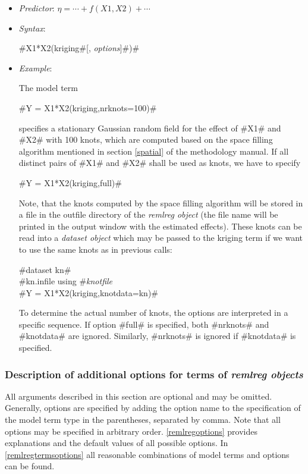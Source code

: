 \begin{itemize}
\item[] {\em Predictor}: $\eta= \cdots + f(X1,X2) + \cdots$
\item[] {\em Syntax}:

#X1*X2(kriging#[, {\em options}]#)# \item[] {\em Example}:

The model term

#Y = X1*X2(kriging,nrknots=100)#

specifies a stationary Gaussian random field for the effect of
#X1# and #X2# with 100 knots, which are computed based on the
space filling algorithm mentioned in section \ref*{spatial} of the
methodology manual. If all distinct pairs of #X1# and #X2# shall
be used as knots, we have to specify

#Y = X1*X2(kriging,full)#

Note, that the knots computed by the space filling algorithm will
be stored in a file in the outfile directory of the {\em remlreg
object} (the file name will be printed in the output window with
the estimated effects). These knots can be read into a {\em
dataset object} which may be passed to the kriging term if we want
to use the same knots as in previous calls:

 #dataset kn#\\
 #kn.infile using #{\em knotfile}\\
 #Y = X1*X2(kriging,knotdata=kn)#

To determine the actual number of knots, the options are
interpreted in a specific sequence. If option #full# is specified,
both #nrknots# and #knotdata# are ignored. Similarly, #nrknots# is
ignored if #knotdata# is specified.

\end{itemize}

\subsubsection{Description of additional options for terms of {\em remlreg objects}}
\label{remlreglocaloptions}

All arguments described in this section are optional and may be
omitted. Generally, options are specified by adding the option
name to the specification of the model term type in the
parentheses, separated by comma. Note that all options may be
specified in arbitrary order. \autoref{remlregoptions} provides
explanations and the default values of all possible options. In
\autoref{remlregtermsoptions} all reasonable combinations of model
terms and options can be found.

